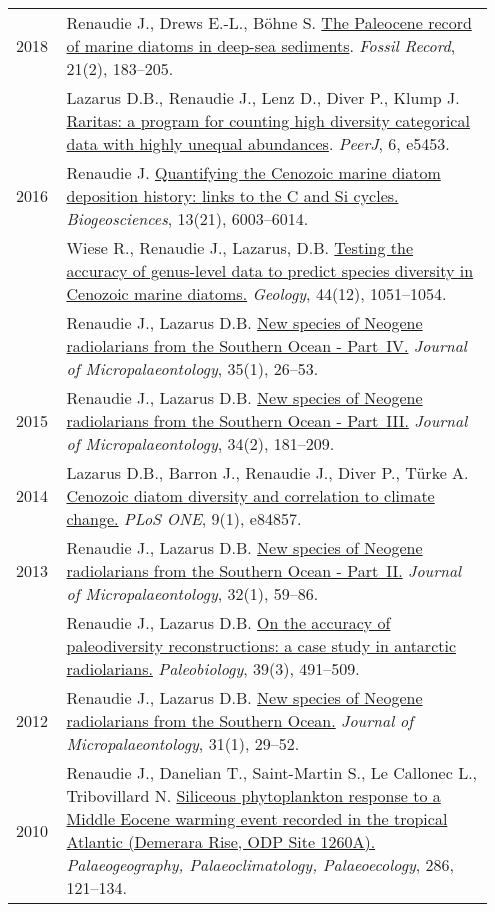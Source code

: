 \documentclass[11pt, a4paper]{article}
\begin{document}
\begin{longtable}{@{}p{0.1\linewidth} P{0.85\linewidth}@{}}
2018 & Renaudie J., Drews E.-L., B\"{o}hne S. \href{http://dx.doi.org/10.5194/fr-21-183-2018}{The Paleocene record of marine diatoms in deep-sea sediments}. \textit{Fossil Record}, 21(2), 183--205.\\
    & Lazarus D.B., Renaudie J., Lenz D., Diver P., Klump J. \href{http://dx.doi.org/10.7717/peerj.5453}{Raritas: a program for counting high diversity categorical data with highly unequal abundances}. \textit{PeerJ}, 6, e5453.\\
2016 & Renaudie J. \href{http://dx.doi.org/10.5194/bg-13-6003-2016}{Quantifying the Cenozoic marine diatom deposition history: links to the C and Si cycles.} \textit{Biogeosciences}, 13(21), 6003--6014.\\
    & Wiese R., Renaudie J., Lazarus, D.B. \href{http://dx.doi.org/10.1130/G38347.1}{Testing the accuracy of genus-level data to predict species diversity in Cenozoic marine diatoms.} \textit{Geology}, 44(12), 1051--1054.\\
    & Renaudie J., Lazarus D.B. \href{http://dx.doi.org/10.1144/jmpaleo2014-026}{New species of Neogene radiolarians from the Southern Ocean - Part IV.} \textit{Journal of Micropalaeontology}, 35(1), 26--53.\\
2015 & Renaudie J., Lazarus D.B. \href{http://dx.doi.org/10.1144/jmpaleo2013-034}{New species of Neogene radiolarians from the Southern Ocean - Part III.} \textit{Journal of Micropalaeontology}, 34(2), 181--209.\\
2014 & Lazarus D.B., Barron J., Renaudie J., Diver P., Türke A. \href{http://dx.doi.org/10.1371/journal.pone.0084857}{Cenozoic diatom diversity and correlation to climate change.} \textit{PLoS ONE}, 9(1), e84857.\\
2013 & Renaudie J., Lazarus D.B. \href{http://dx.doi.org/10.1144/jmpaleo2011-025}{New species of Neogene radiolarians from the Southern Ocean - Part II.} \textit{Journal of Micropalaeontology}, 32(1), 59--86.\\
    & Renaudie J., Lazarus D.B. \href{http://dx.doi.org/10.1666/12016}{On the accuracy of paleodiversity reconstructions: a case study in antarctic radiolarians.} \textit{Paleobiology}, 39(3), 491--509.\\
2012 & Renaudie J., Lazarus D.B. \href{http://dx.doi.org/10.1144/0262-821X10-026}{New species of Neogene radiolarians from the Southern Ocean.} \textit{Journal of Micropalaeontology}, 31(1), 29--52.\\
2010 & Renaudie J., Danelian T., Saint-Martin S., Le Callonec L., Tribovillard N. \href{http://dx.doi.org/10.1016/j.palaeo.2009.12.004}{Siliceous phytoplankton response to a Middle Eocene warming event recorded in the tropical Atlantic (Demerara Rise, ODP Site 1260A).} \textit{Palaeogeography, Palaeoclimatology, Palaeoecology}, 286, 121--134.\\
\end{longtable}
\end{document}
